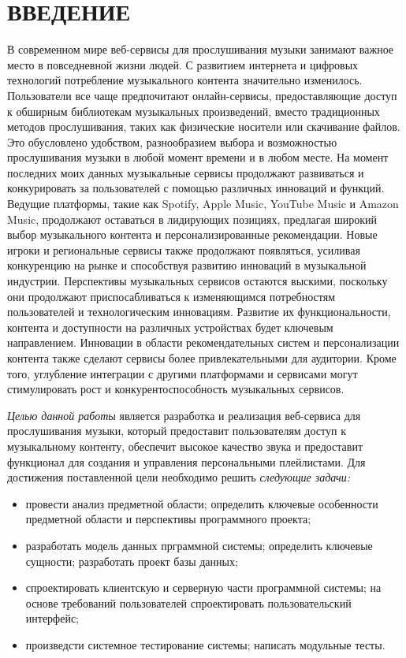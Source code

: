 \section*{ВВЕДЕНИЕ}

В современном мире веб-сервисы для прослушивания музыки занимают важное место в повседневной жизни людей. С развитием интернета и цифровых технологий потребление музыкального контента значительно изменилось. Пользователи все чаще предпочитают онлайн-сервисы, предоставляющие доступ к обширным библиотекам музыкальных произведений, вместо традиционных методов прослушивания, таких как физические носители или скачивание файлов. Это обусловлено удобством, разнообразием выбора и возможностью прослушивания музыки в любой момент времени и в любом месте.
На момент последних моих данных музыкальные сервисы продолжают развиваться и конкурировать за пользователей с помощью различных инноваций и функций. 
Ведущие платформы, такие как Spotify, Apple Music, YouTube Music и Amazon Music, продолжают оставаться в лидирующих позициях, предлагая широкий выбор музыкального контента и персонализированные рекомендации.
Новые игроки и региональные сервисы также продолжают появляться, усиливая конкуренцию на рынке и способствуя развитию инноваций в музыкальной индустрии. 
Перспективы музыкальных сервисов остаются выскими, поскольку они продолжают приспосабливаться к изменяющимся потребностям пользователей и технологическим инновациям. Развитие их функциональности, контента и доступности на различных устройствах будет ключевым направлением. Инновации в области рекомендательных систем и персонализации контента также сделают сервисы более привлекательными для аудитории. Кроме того, углубление интеграции с другими платформами и сервисами могут стимулировать рост и конкурентоспособность музыкальных сервисов.

\emph{Целью данной работы} является разработка и реализация веб-сервиса для прослушивания музыки, который предоставит пользователям  доступ к музыкальному контенту, обеспечит высокое качество звука и предоставит функционал для создания и управления персональными плейлистами. Для достижения поставленной цели необходимо решить \emph{следующие задачи:}
\begin{itemize}
	\item провести анализ предметной области; определить ключевые особенности предметной области и перспективы программного проекта;
	\item разработать модель данных прграммной системы; определить ключевые сущности; разработать проект базы данных;
	\item спроектировать клиентскую и серверную части программной системы; на основе требований пользователей спроектировать пользовательский интерфейс;
	\item произведсти системное тестирование системы; написать модульные тесты.
\end{itemize}

